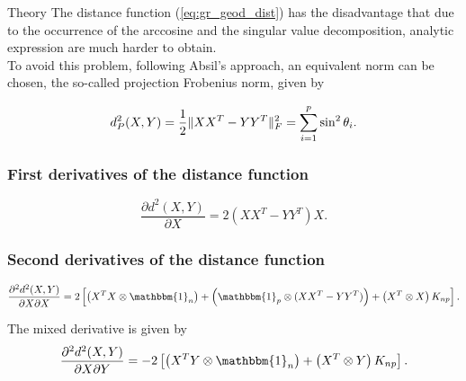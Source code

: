 \begin{chapter}{Theory}
The distance function (\ref{eq:gr_geod_dist}) has the disadvantage that due to the occurrence of the arccosine
and the singular value decomposition, analytic expression are much harder to obtain.\\

To avoid this problem, following Absil's \cite{AbsilGrassmann} approach, an equivalent norm can be chosen, the so-called projection Frobenius norm, given by

\begin{equation}
    d_P^2(X,Y) = \frac{1}{2}\| XX^T-YY^T \|_{F}^{2} = \sum_{i=1}^p\sin^2\theta_i.
\end{equation}




\subsubsection{First derivatives of the distance function} %
\label{ssub:First derivatives of the distance function}

\begin{equation}
    \label{eq:gr_x_der}
    \frac{\partial d^2(X,Y)}{\partial X} = 2\left(XX^T-YY^T\right)X.
\end{equation}



\subsubsection{Second derivatives of the distance function} %
\label{ssub:Second derivatives of the distance function}

\begin{equation}
    \label{eq:gr_xx_der}
    \frac{\partial^2 d^2(X,Y)}{\partial X\partial X} = 2
    \left[
	\left(X^TX\otimes \mathbbm{1}_{n}\right) 
	+ \left(\mathbbm{1}_p\otimes (XX^T-YY^T)\right)
	+ \left(X^T\otimes X\right)K_{np}
    \right].
\end{equation}

The mixed derivative is given by
\begin{equation}
    \label{eq:gr_xy_der}
    \frac{\partial^2 d^2(X,Y)}{\partial X\partial Y} = -2\left[\left(X^TY\otimes \mathbbm{1}_{n}\right) + \left(X^T\otimes Y\right)K_{np}\right].
\end{equation}





\end{chapter}
